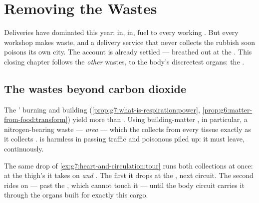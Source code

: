 \chapter{Removing the Wastes}\label{ch:g7:removing-wastes}

Deliveries have dominated this year:  in, 
in, fuel to every working . But every workshop makes
waste, and a delivery service that never collects the
rubbish soon poisons its own city. The 
account is already settled --- breathed out at the .
This closing chapter follows the \emph{other} wastes, to
the body's discreetest organs: the .

\section{The wastes beyond carbon dioxide}

\begin{proposition}\label{prop:g7:removing-wastes:rubbish}
The ' burning and building
(\cref{prop:g7:what-is-respiration:power},
\cref{prop:g6:matter-from-food:transform}) yield more than
. Using building-matter , in
particular,  a nitrogen-bearing waste ---
\emph{urea} --- which the  collects from
every tissue exactly as it collects . 
is harmless in passing traffic and poisonous piled up: it
must leave, continuously.
\end{proposition}
\admitted

\begin{example}\label{ex:g7:removing-wastes:rounds}
The same drop of \cref{ex:g7:heart-and-circulation:tour}
runs both collections at once: at the thigh's 
it takes on  \emph{and} . The first it
drops at the , next circuit. The second rides on ---
past the , which cannot touch it --- until the body
circuit carries it through the organs built for exactly
this cargo.
\end{example}

